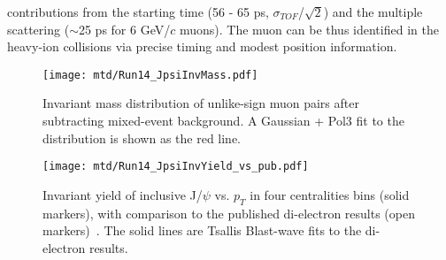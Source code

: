 contributions from the starting time (56 - 65 ps, $\sigma_{TOF}$/$\sqrt{2}$) and the multiple scattering ($\sim$25 ps for 6 GeV/$c$ muons). The muon can be thus identified in the heavy-ion collisions via precise timing and modest position information.


\begin{figure}[htbp]
\begin{minipage}[htbp]{0.48\linewidth}
\centering
\texttt{[image: mtd/Run14\_JpsiInvMass.pdf]}
\caption{Invariant mass distribution of unlike-sign muon pairs after subtracting mixed-event background. A Gaussian + Pol3 fit to the distribution is shown as the red line.\label{jpsiviamumu}}
\end{minipage}
\hfill
\begin{minipage}[htbp]{0.48\linewidth}
\centering
\texttt{[image: mtd/Run14\_JpsiInvYield\_vs\_pub.pdf]} 
\caption{Invariant yield of inclusive J/$\psi$ vs. $p_{T}$ in four centralities bins (solid markers), with comparison to the published di-electron results (open markers)~\cite{JpsiViaee0, JpsiViaee1}. The solid lines are Tsallis Blast-wave fits to the di-electron results.\label{jpsiyield}}
\end{minipage}
\end{figure}

